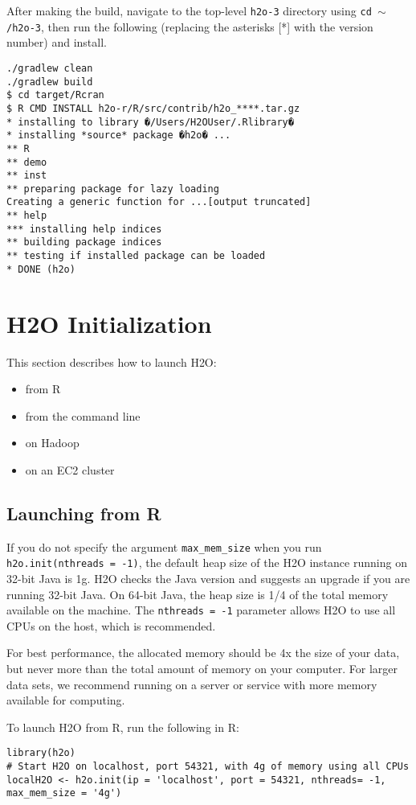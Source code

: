 After making the build, navigate to the top-level \texttt{h2o-3} directory using {\texttt{cd $\mathtt{\sim}$/h2o-3}}, then run the following (replacing the asterisks [*] with the version number) and install.
\begin{lstlisting}[style=R]
./gradlew clean 
./gradlew build
$ cd target/Rcran
$ R CMD INSTALL h2o-r/R/src/contrib/h2o_****.tar.gz
* installing to library �/Users/H2OUser/.Rlibrary�
* installing *source* package �h2o� ...
** R
** demo
** inst
** preparing package for lazy loading
Creating a generic function for ...[output truncated]
** help
*** installing help indices
** building package indices
** testing if installed package can be loaded
* DONE (h2o)
\end{lstlisting}

\section{H2O Initialization}

This section describes how to launch H2O: 
\begin{itemize}
\item from R
\item from the command line
\item on Hadoop
\item on an EC2 cluster
\end{itemize}

\subsection{Launching from R} \label{ssec:LaunchR}

If you do not specify the argument {\texttt{max\_mem\_size}} when you run {\texttt{h2o.init(nthreads = -1)}}, the default heap size of the H2O instance running on 32-bit Java is 1g. H2O checks the Java version and suggests an upgrade if you are running 32-bit Java. On 64-bit Java, the heap size is 1/4 of the total memory available on the machine. The {\texttt{nthreads = -1}} parameter allows H2O to use all CPUs on the host, which is recommended. 

For best performance, the allocated memory should be 4x the size of your data, but never more than the total amount of memory on your computer. For larger data sets, we recommend running on a server or service with more memory available for computing.


To launch H2O from R, run the following in R:
\begin{lstlisting}[style=R]
library(h2o)
# Start H2O on localhost, port 54321, with 4g of memory using all CPUs
localH2O <- h2o.init(ip = 'localhost', port = 54321, nthreads= -1, max_mem_size = '4g')
\end{lstlisting}

